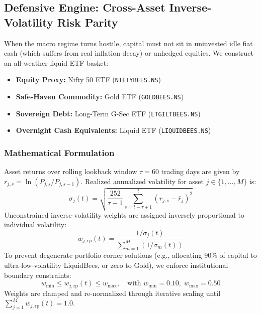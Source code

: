 \documentclass[11pt,a4paper]{article}
\begin{document}
\subsection{Defensive Engine: Cross-Asset Inverse-Volatility Risk Parity}
When the macro regime turns hostile, capital must not sit in uninvested idle fiat cash (which suffers from real inflation decay) or unhedged equities. We construct an all-weather liquid ETF basket:
\begin{itemize}
    \item \textbf{Equity Proxy:} Nifty 50 ETF (\texttt{NIFTYBEES.NS})
    \item \textbf{Safe-Haven Commodity:} Gold ETF (\texttt{GOLDBEES.NS})
    \item \textbf{Sovereign Debt:} Long-Term G-Sec ETF (\texttt{LTGILTBEES.NS})
    \item \textbf{Overnight Cash Equivalents:} Liquid ETF (\texttt{LIQUIDBEES.NS})
\end{itemize}

\subsubsection{Mathematical Formulation}
Asset returns over rolling lookback window $\tau = 60$ trading days are given by $r_{j, s} = \ln(P_{j, s} / P_{j, s-1})$. Realized annualized volatility for asset $j \in \{1, \dots, M\}$ is:
\begin{equation}
\sigma_j(t) = \sqrt{\frac{252}{\tau - 1} \sum_{s=t-\tau+1}^{t} \left( r_{j, s} - \bar{r}_j \right)^2}
\end{equation}
Unconstrained inverse-volatility weights are assigned inversely proportional to individual volatility:
\begin{equation}
\tilde{w}_{j, \text{rp}}(t) = \frac{1 / \sigma_j(t)}{\sum_{m=1}^{M} (1 / \sigma_m(t))}
\end{equation}
To prevent degenerate portfolio corner solutions (e.g., allocating $90\%$ of capital to ultra-low-volatility LiquidBees, or zero to Gold), we enforce institutional boundary constraints:
\begin{equation}
w_{\min} \le w_{j, \text{rp}}(t) \le w_{\max}, \quad \text{with } w_{\min} = 0.10, \; w_{\max} = 0.50
\end{equation}
Weights are clamped and re-normalized through iterative scaling until $\sum_{j=1}^{M} w_{j, \text{rp}}(t) = 1.0$.
\end{document}
